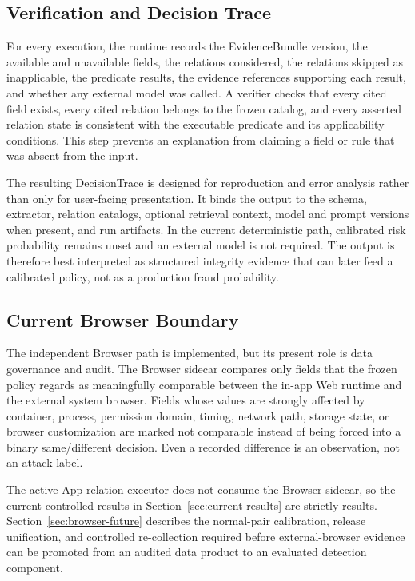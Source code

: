 \subsection{Verification and Decision Trace}

For every execution, the runtime records the EvidenceBundle version, the available and unavailable fields, the relations considered, the relations skipped as inapplicable, the predicate results, the evidence references supporting each result, and whether any external model was called. A verifier checks that every cited field exists, every cited relation belongs to the frozen catalog, and every asserted relation state is consistent with the executable predicate and its applicability conditions. This step prevents an explanation from claiming a field or rule that was absent from the input.

The resulting DecisionTrace is designed for reproduction and error analysis rather than only for user-facing presentation. It binds the output to the schema, extractor, relation catalogs, optional retrieval context, model and prompt versions when present, and run artifacts. In the current deterministic path, calibrated risk probability remains unset and an external model is not required. The output is therefore best interpreted as structured integrity evidence that can later feed a calibrated policy, not as a production fraud probability.

\subsection{Current Browser Boundary}

The independent Browser path is implemented, but its present role is data governance and audit. The Browser sidecar compares only fields that the frozen policy regards as meaningfully comparable between the in-app Web runtime and the external system browser. Fields whose values are strongly affected by container, process, permission domain, timing, network path, storage state, or browser customization are marked not comparable instead of being forced into a binary same/different decision. Even a recorded difference is an observation, not an attack label.

The active App relation executor does not consume the Browser sidecar, so the current controlled results in Section~\ref{sec:current-results} are strictly \appfp results. Section~\ref{sec:browser-future} describes the normal-pair calibration, release unification, and controlled re-collection required before external-browser evidence can be promoted from an audited data product to an evaluated detection component.
